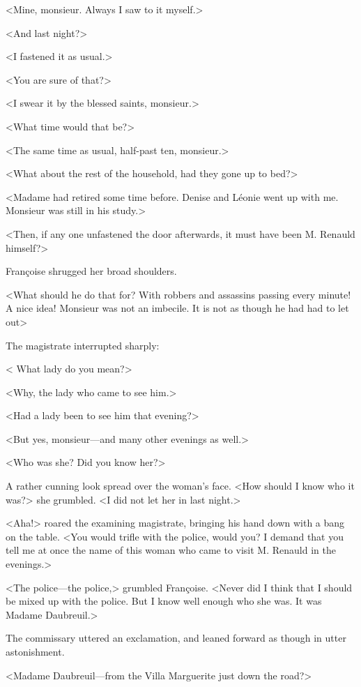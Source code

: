  <Mine, monsieur. Always I saw to it myself.> 

 <And last night?> 

 <I fastened it as usual.> 

 <You are sure of that?> 

 <I swear it by the blessed saints, monsieur.> 

 <What time would that be?> 

 <The same time as usual, half-past ten, monsieur.> 

 <What about the rest of the household, had they gone up to bed?> 

 <Madame had retired some time before. Denise and Léonie went up with me. Monsieur was still in his study.> 

 <Then, if any one unfastened the door afterwards, it must have been M. Renauld himself?> 

 Françoise shrugged her broad shoulders. 

 <What should he do that for? With robbers and assassins passing every minute! A nice idea! Monsieur was not an imbecile. It is not as though he had had to let  out\longdash> 

 The magistrate interrupted sharply: 

 < What lady do you mean?> 

 <Why, the lady who came to see him.> 

 <Had a lady been to see him that evening?> 

 <But yes, monsieur—and many other evenings as well.> 

 <Who was she? Did you know her?> 

 A rather cunning look spread over the woman's face. <How should I know who it was?> she grumbled. <I did not let her in last night.> 

 <Aha!> roared the examining magistrate, bringing his hand down with a bang on the table. <You would trifle with the police, would you? I demand that you tell me at once the name of this woman who came to visit M. Renauld in the evenings.> 

 <The police—the police,> grumbled Françoise. <Never did I think that I should be mixed up with the police. But I know well enough who she was. It was Madame Daubreuil.> 

 The commissary uttered an exclamation, and leaned forward as though in utter astonishment. 

 <Madame Daubreuil—from the Villa Marguerite just down the road?> 

